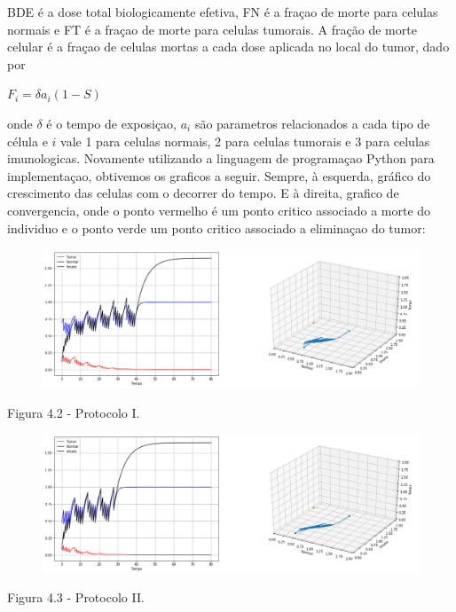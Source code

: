 \documentclass[12pt, a4paper]{article}
\begin{document}
BDE é a dose total biologicamente efetiva, FN é a fraçao de morte para celulas normais e FT é a fraçao de morte para celulas tumorais. A fração de morte celular é a fraçao de celulas mortas a cada dose aplicada no local do tumor, dado por

\begin{center}
$ F_i = \delta a_i (1 - S)$
\end{center}

onde $\delta$ é o tempo de exposiçao, $a_i$ são parametros relacionados a cada tipo de célula e $i$ vale 1 para celulas normais, 2 para celulas tumorais e 3 para celulas imunologicas. Novamente utilizando a linguagem de programaçao Python para implementaçao, obtivemos os graficos a seguir. Sempre, à esquerda, gráfico do crescimento das celulas com o decorrer do tempo. E à direita, grafico de convergencia, onde o ponto vermelho é um ponto critico associado a morte do individuo e o ponto verde um ponto critico associado a eliminaçao do tumor:

\newpage

\begin{center}
\begin{figure}[!h]
	\centering
    \includegraphics[scale=0.4]{imgs/plot_trat_1.png}

  \end{figure}


Figura 4.2 - Protocolo I.
\end{center}

\begin{center}
\begin{figure}[!h]
	\centering
    \includegraphics[scale=0.4]{imgs/plot_trat_2.png}

  \end{figure}


Figura 4.3 - Protocolo II.
\end{center}
\end{document}
